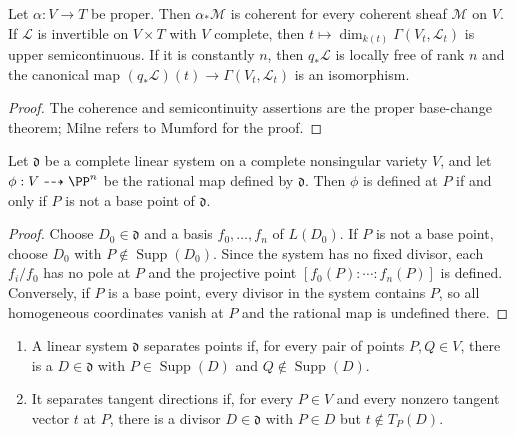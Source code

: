 \begin{lemma}
\label{lem:milne-5-15}

Let $\alpha:V\to T$ be proper.  Then $\alpha_*\mathcal M$ is coherent for
every coherent sheaf $\mathcal M$ on $V$.  If $\mathcal L$ is invertible on
$V\times T$ with $V$ complete, then $t\mapsto\dim_{k(t)}\Gamma(V_t,\mathcal
L_t)$ is upper semicontinuous.  If it is constantly $n$, then $q_*\mathcal L$
is locally free of rank $n$ and the canonical map
$(q_*\mathcal L)(t)\to\Gamma(V_t,\mathcal L_t)$ is an isomorphism.
\end{lemma}

\begin{proof}
The coherence and semicontinuity assertions are the proper base-change theorem;
Milne refers to Mumford for the proof.
\end{proof}
\begin{proposition}
\label{prop:milne-6-1}

Let $\mathfrak d$ be a complete linear system on a complete nonsingular variety
$V$, and let $\phi:V\dashrightarrow\PP^n$ be the rational map defined by
$\mathfrak d$.  Then $\phi$ is defined at $P$ if and only if $P$ is not a base
point of $\mathfrak d$.
\end{proposition}

\begin{proof}
Choose $D_0\in\mathfrak d$ and a basis $f_0,\ldots,f_n$ of $L(D_0)$.  If
$P$ is not a base point, choose $D_0$ with $P\notin\operatorname{Supp}(D_0)$.
Since the system has no fixed divisor, each $f_i/f_0$ has no pole at $P$ and
the projective point $[f_0(P):\cdots:f_n(P)]$ is defined.  Conversely, if $P$
is a base point, every divisor in the system contains $P$, so all homogeneous
coordinates vanish at $P$ and the rational map is undefined there.
\end{proof}

\begin{definition}
\label{def:milne-6-2}

\begin{enumerate}
\item A linear system $\mathfrak d$ separates points if, for every pair of
points $P,Q\in V$, there is a $D\in\mathfrak d$ with
$P\in\operatorname{Supp}(D)$ and $Q\notin\operatorname{Supp}(D)$.
\item It separates tangent directions if, for every $P\in V$ and every
nonzero tangent vector $t$ at $P$, there is a divisor $D\in\mathfrak d$ with
$P\in D$ but $t\notin T_P(D)$.
\end{enumerate}
\end{definition}

